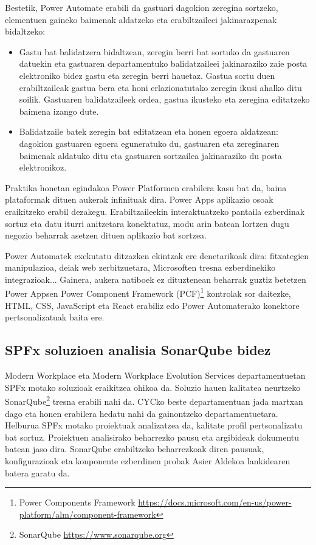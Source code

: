 Bestetik, Power Automate erabili da gastuari dagokion zeregina sortzeko, elementuen gaineko baimenak aldatzeko eta erabiltzaileei jakinarazpenak
bidaltzeko:

\begin{itemize}
  \item Gastu bat balidatzera bidaltzean, zeregin berri bat sortuko da gastuaren datuekin eta gastuaren departamentuko balidatzaileei jakinaraziko zaie
  posta elektroniko bidez gastu eta zeregin berri hauetaz. Gastua sortu duen erabiltzaileak gastua bera eta honi erlazionatutako zeregin ikusi ahalko ditu
  soilik. Gastuaren balidatzaileek ordea, gastua ikusteko eta zeregina editatzeko baimena izango dute. 
  \item Balidatzaile batek zeregin bat editatzean eta honen egoera aldatzean: dagokion gastuaren egoera eguneratuko du, gastuaren eta zereginaren baimenak
  aldatuko ditu eta gastuaren sortzailea jakinaraziko du posta elektronikoz.
\end{itemize}

Praktika honetan egindakoa Power Platformen erabilera kasu bat da, baina plataformak dituen aukerak infinituak dira. Power Apps aplikazio osoak eraikitzeko
erabil dezakegu. Erabiltzaileekin interaktuatzeko pantaila ezberdinak sortuz eta datu iturri anitzetara konektatuz, modu arin batean lortzen dugu negozio
beharrak asetzen dituen aplikazio bat sortzea. 

Power Automatek exekutatu ditzazken ekintzak ere denetarikoak dira: fitxategien manipulazioa, deiak web 
zerbitzuetara, Microsoften tresna ezberdinekiko integrazioak... Gainera, aukera natiboek ez dituztenean beharrak guztiz betetzen Power Appsen
Power Component Framework (PCF)\footnote{Power Components Framework \url{https://docs.microsoft.com/en-us/power-platform/alm/component-framework}} kontrolak sor daitezke, HTML, CSS, JavaScript eta React erabiliz edo Power Automaterako konektore pertsonalizatuak baita ere.

\subsection{SPFx soluzioen analisia SonarQube bidez} \label{sonarqube}

Modern Workplace eta Modern Workplace Evolution Services departamentuetan SPFx motako soluzioak eraikitzea ohikoa da.
Soluzio hauen kalitatea neurtzeko SonarQube\footnote{SonarQube \url{https://www.sonarqube.org}} tresna erabili nahi da. CYCko beste departamentuan jada martxan dago eta honen erabilera hedatu nahi da gainontzeko departamentuetara.
Helburua SPFx motako proiektuak analizatzea da, kalitate profil pertsonalizatu bat sortuz. Proiektuen analisirako beharrezko pausu eta argibideak dokumentu batean jaso dira. SonarQube erabiltzeko beharrezkoak diren pausuak, konfigurazioak eta konponente ezberdinen probak Asier Aldekoa lankidearen batera garatu da. 


